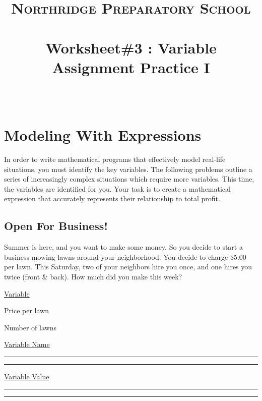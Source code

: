 \documentclass[paper=a4, fontsize=11pt]{scrartcl} %
\title{	
\normalfont \normalsize 
\textsc{Northridge Preparatory School} \\ [25pt] %
\horrule{0.5pt} \\[0.4cm] %
\huge Worksheet\#3 : Variable Assignment Practice I\\ %
\horrule{2pt} \\[0.5cm] %
}
\author{} %
\date{} %
\numberwithin{equation}{section} %
\numberwithin{figure}{section} %
\numberwithin{table}{section} %
\begin{document}
\maketitle %


\section{Modeling With Expressions}




In order to write mathematical programs that effectively model real-life situations, you must identify the key variables.  The following problems outline a series of increasingly complex situations which require more variables.  This time, the variables are identified for you.  Your task is to create a mathematical expression that accurately represents their relationship to total profit.


\subsection{Open For Business!}

Summer is here, and you want to make some money.  So you decide to start a business mowing lawns around your neighborhood. You decide to charge \$5.00 per lawn.  This Saturday, two of your neighbors hire you once, and one hires you twice (front \& back).  How much did you make this week?

\begin{multicols}{3}

\begin{doublespacing}

\underline{Variable}

Price per lawn

Number of lawns

\underline{Variable Name}

\rule{2.5cm}{0.15mm}

\rule{2.5cm}{0.15mm}

\underline{Variable Value}

\rule{2.5cm}{0.15mm}

\rule{2.5cm}{0.15mm}

\end{doublespacing}
\end{multicols}
\end{document}
